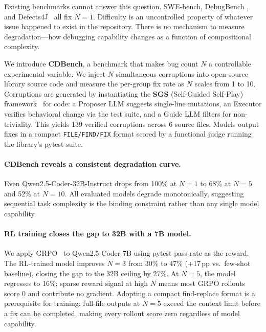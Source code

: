 \documentclass[12pt]{article}
\begin{document}
Existing benchmarks cannot answer this question. SWE-bench, DebugBench
\cite{tian2024debugbench}, and Defects4J~\cite{just2014defects4j} all fix
$N{=}1$. Difficulty is an uncontrolled property of whatever issue happened to
exist in the repository. There is no mechanism to measure degradation---how
debugging capability changes as a function of compositional complexity.

We introduce \textbf{CDBench}, a benchmark that makes bug count $N$ a
controllable experimental variable. We inject $N$ simultaneous corruptions into
open-source library source code and measure the per-group fix rate as $N$
scales from 1 to 10. Corruptions are generated by instantiating the
\textbf{SGS} (Self-Guided Self-Play) framework~\cite{sgs2025} for code: a
Proposer LLM suggests single-line mutations, an Executor verifies behavioral
change via the test suite, and a Guide LLM filters for non-triviality. This
yields 139 verified corruptions across 6 source files. Models output fixes in
a compact \texttt{FILE/FIND/FIX} format scored by a functional judge running
the library's pytest suite.

\paragraph{CDBench reveals a consistent degradation curve.}
Even Qwen2.5-Coder-32B-Instruct drops from 100\% at $N{=}1$ to 68\% at
$N{=}5$ and 52\% at $N{=}10$. All evaluated models degrade monotonically,
suggesting sequential task complexity is the binding constraint rather than
any single model capability.

\paragraph{RL training closes the gap to 32B with a 7B model.}
We apply GRPO~\cite{shao2024deepseekmath,guo2025deepseek} to
Qwen2.5-Coder-7B using pytest pass rate as the reward. The RL-trained model
improves $N{=}3$ from 30\% to 47\% (+17\,pp vs.\ few-shot baseline), closing
the gap to the 32B ceiling by 27\%. At $N{=}5$, the model regresses to 16\%; sparse reward signal at high $N$
means most GRPO rollouts score 0 and contribute no gradient. Adopting a compact find-replace format is a prerequisite for training: full-file outputs at $N{=}5$ exceed the context limit before a fix can be completed, making every rollout score zero regardless of model capability.
\end{document}
